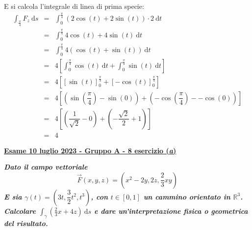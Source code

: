 \documentclass[a4paper]{article}
\newcommand{\definition}[1]{\textcolor{Red3}{\textbf{#1}}}
\newcommand{\example}[1]{\textcolor{Green4}{\textbf{#1}}}
\begin{document}
	\noindent
	E si calcola l'integrale di linea di prima specie:
	\begin{equation*}
		\begin{array}{rcl}
			\displaystyle\int_{\frac{\pi}{4}} F_{z} \:\mathrm{d}s
			&=&
			\displaystyle\int_{0}^{\frac{\pi}{4}} \left(2\cos\left(t\right) + 2\sin\left(t\right)\right) \cdot 2 \:\mathrm{d}t \\ [1.5em]
			&=&
			\displaystyle\int_{0}^{\frac{\pi}{4}} 4\cos\left(t\right) + 4\sin\left(t\right) \:\mathrm{d}t \\ [1.5em]
			&=&
			\displaystyle\int_{0}^{\frac{\pi}{4}} 4\left(\cos\left(t\right) + \sin\left(t\right)\right) \:\mathrm{d}t \\ [1.5em]
			&=&
			4\left[\displaystyle\int_{0}^{\frac{\pi}{4}} \cos\left(t\right) \:\mathrm{d}t + \displaystyle\int_{0}^{\frac{\pi}{4}} \sin\left(t\right) \:\mathrm{d}t\right] \\ [1.5em]
			&=&
			4\left[\left[\sin\left(t\right)\right]_{0}^{\frac{\pi}{4}} + \left[-\cos\left(t\right)\right]_{0}^{\frac{\pi}{4}}\right] \\ [1.5em]
			&=&
			4\left[\left(\sin\left(\dfrac{\pi}{4}\right) - \sin\left(0\right)\right) + \left(-\cos\left(\dfrac{\pi}{4}\right) - -\cos\left(0\right)\right)\right] \\ [1.5em]
			&=&
			4\left[\left(\dfrac{1}{\sqrt{2}} - 0\right) + \left(-\dfrac{\sqrt{2}}{2} + 1\right)\right] \\ [1.5em]
			&=& 4
		\end{array}
	\end{equation*}

	\newpage

	\begin{flushleft}
		\label{exam: esame 10 luglio 2023 - Gruppo A - 8 esercizio (a)}
		\hypertarget{
			exam: esame 10 luglio 2023 - Gruppo A - 8 esercizio (a)
		}{
			\definition{\underline{Esame 10 luglio 2023 - Gruppo A - 8 esercizio (\emph{a})}}
		}
	\end{flushleft}
	\example{\emph{Dato il campo vettoriale}
	\begin{equation*}
		\overset{\rightarrow}{F}\left(x,y,z\right) = \left(x^{2} - 2y, 2z, \dfrac{2}{3}xy\right)
	\end{equation*}
	\emph{E sia $\gamma\left(t\right) = \left(3t, \dfrac{3}{2}t^{2}, t^{3}\right)$, con $t \in \left[0,1\right]$ un cammino orientato in $\mathbb{R}^{3}$. Calcolare $\int_{\gamma}\left(\frac{2}{3}x+4z\right)\:\mathrm{d}s$ e dare un'interpretazione fisica o geometrica del risultato.}}\newline
\end{document}
